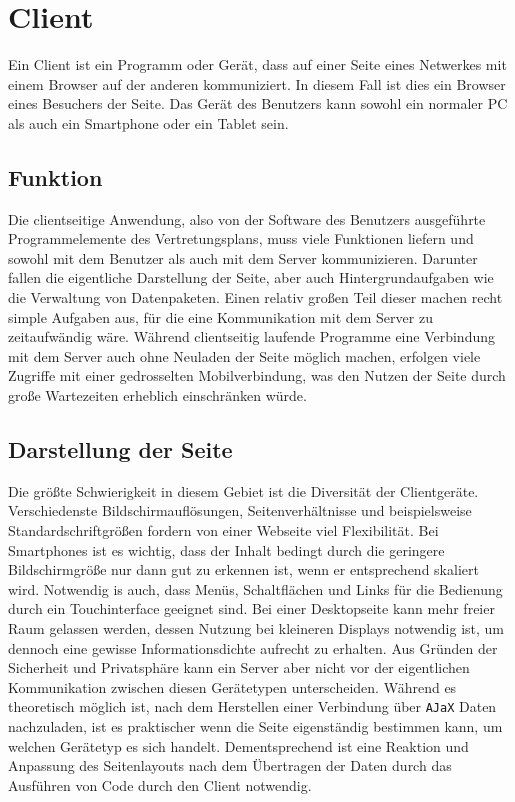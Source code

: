 \section{Client}
Ein Client ist ein Programm oder Gerät, dass auf einer Seite eines Netwerkes mit einem Browser auf der anderen kommuniziert. In diesem Fall ist dies ein Browser eines Besuchers der Seite. Das Gerät des Benutzers kann sowohl ein normaler PC als auch ein Smartphone oder ein Tablet sein. 
\subsection{Funktion}
Die clientseitige Anwendung, also von der Software des Benutzers ausgeführte Programmelemente des Vertretungsplans, muss viele Funktionen liefern und sowohl mit dem Benutzer als auch mit dem Server kommunizieren. Darunter fallen die eigentliche Darstellung der Seite, aber auch Hintergrundaufgaben wie die Verwaltung von Datenpaketen. Einen relativ großen Teil dieser machen recht simple Aufgaben aus, für die eine Kommunikation mit dem Server zu zeitaufwändig wäre. Während clientseitig laufende Programme eine Verbindung mit dem Server auch ohne Neuladen der Seite möglich machen, erfolgen viele Zugriffe mit einer gedrosselten Mobilverbindung, was den Nutzen der Seite durch große Wartezeiten erheblich einschränken würde.

\subsection{Darstellung der Seite}
Die größte Schwierigkeit in diesem Gebiet ist die Diversität der Clientgeräte. Verschiedenste Bildschirmauflösungen, Seitenverhältnisse und beispielsweise Standardschriftgrößen fordern von einer Webseite viel Flexibilität. Bei Smartphones ist es wichtig, dass der Inhalt bedingt durch die geringere Bildschirmgröße nur dann gut zu erkennen ist, wenn er entsprechend skaliert wird. Notwendig is auch, dass Menüs, Schaltflächen und Links für die Bedienung durch ein Touchinterface geeignet sind. Bei einer Desktopseite kann mehr freier Raum gelassen werden, dessen Nutzung bei kleineren Displays notwendig ist, um dennoch eine gewisse Informationsdichte aufrecht zu erhalten. Aus Gründen der Sicherheit und Privatsphäre kann ein Server aber nicht vor der eigentlichen Kommunikation zwischen diesen Gerätetypen unterscheiden. Während es theoretisch möglich ist, nach dem Herstellen einer Verbindung über \texttt{AJaX} Daten nachzuladen, ist es praktischer wenn die Seite eigenständig bestimmen kann, um welchen Gerätetyp es sich handelt. Dementsprechend ist eine Reaktion und Anpassung des Seitenlayouts nach dem Übertragen der Daten durch das Ausführen von Code durch den Client notwendig.


